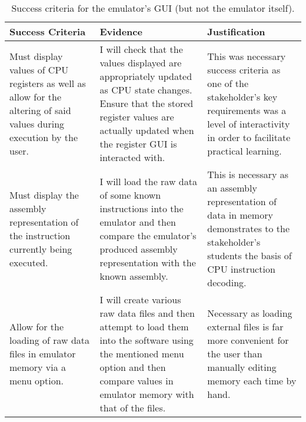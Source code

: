         \begin{table}
            \begin{tabular} { | m{} | m{} | m{} | }
                \hline
                \textbf{Success Criteria} & \textbf{Evidence} & \textbf{Justification} \\
                \hline
                Must display values of CPU registers as well as allow for the altering of said values during execution by the user. &
                I will check that the values displayed are appropriately updated as CPU state changes. Ensure that the stored register values are actually updated when the register GUI is interacted with. &
                This was necessary success criteria as one of the stakeholder's key requirements was a level of interactivity in order to facilitate practical learning. \\
                \hline
                Must display the assembly representation of the instruction currently being executed. &
                I will load the raw data of some known instructions into the emulator and then compare the emulator's produced assembly representation with the known assembly. &
                This is necessary as an assembly representation of data in memory demonstrates to the stakeholder's students the basis of CPU instruction decoding. \\
                \hline
                Allow for the loading of raw data files in emulator memory via a menu option. &
                I will create various raw data files and then attempt to load them into the software using the mentioned menu option and then compare values in emulator memory with that of the files. &
                Necessary as loading external files is far more convenient for the user than manually editing memory each time by hand. \\
                \hline
            \end{tabular}
            \caption{Success criteria for the emulator's GUI (but not the emulator itself).}
            \label{table:gui-success-criteria}
        \end{table}


